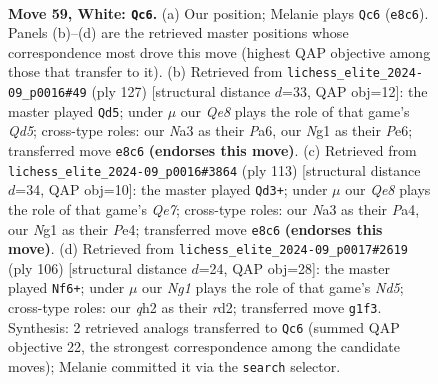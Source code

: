 \documentclass[11pt]{article}
\begin{document}
\clearpage

\begin{figure}[p]\centering
\begin{subfigure}{0.46\textwidth}\centering
\resizebox{\linewidth}{!}{%
\newchessgame
\chessboard[
  setfen={4Q3/7k/p3P3/3P3p/6p1/Nb6/5P1q/5KN1 w - - 1 59},
  showmover=false,
  pgfstyle=straightmove, color=movearrow, markmove={e8-c6}
]}
\caption{}
\end{subfigure}\hfill
\begin{subfigure}{0.46\textwidth}\centering
\resizebox{\linewidth}{!}{%
\newchessgame
\chessboard[
  setfen={6k1/4Q2p/p3p1p1/6P1/P2q3P/6K1/8/8 b - - 9 64},
  showmover=false,
  pgfstyle=straightmove, color=movearrow, markmove={d4-d5}
]}
\caption{}
\end{subfigure}
\\[4pt]
\begin{subfigure}{0.46\textwidth}\centering
\resizebox{\linewidth}{!}{%
\newchessgame
\chessboard[
  setfen={8/6k1/2p5/3p2P1/p3pQ2/2P4K/PP2q3/8 b - - 8 57},
  showmover=false,
  pgfstyle=straightmove, color=movearrow, markmove={e2-d3}
]}
\caption{}
\end{subfigure}\hfill
\begin{subfigure}{0.46\textwidth}\centering
\resizebox{\linewidth}{!}{%
\newchessgame
\chessboard[
  setfen={6k1/1Q6/p2q2p1/3N1pP1/8/1P4PK/3r4/8 w - - 8 54},
  showmover=false,
  pgfstyle=straightmove, color=movearrow, markmove={d5-f6}
]}
\caption{}
\end{subfigure}
\caption{\textbf{Move 59, White: \texttt{Qc6}.} (a) Our position; Melanie plays \texttt{Qc6} (\texttt{e8c6}). Panels (b)--(d) are the retrieved master positions whose correspondence most drove this move (highest QAP objective among those that transfer to it). (b) Retrieved from \texttt{lichess\_elite\_2024-09\_p0016\#49} (ply 127) [structural distance $d$=33, QAP obj=12]: the master played \texttt{Qd5}; under $\mu$ our \emph{Qe8} plays the role of that game's \emph{Qd5}; cross-type roles: our \emph{N}a3 as their \emph{P}a6, our \emph{N}g1 as their \emph{P}e6; transferred move \texttt{e8c6} \textbf{(endorses this move)}. (c) Retrieved from \texttt{lichess\_elite\_2024-09\_p0016\#3864} (ply 113) [structural distance $d$=34, QAP obj=10]: the master played \texttt{Qd3+}; under $\mu$ our \emph{Qe8} plays the role of that game's \emph{Qe7}; cross-type roles: our \emph{N}a3 as their \emph{P}a4, our \emph{N}g1 as their \emph{P}e4; transferred move \texttt{e8c6} \textbf{(endorses this move)}. (d) Retrieved from \texttt{lichess\_elite\_2024-09\_p0017\#2619} (ply 106) [structural distance $d$=24, QAP obj=28]: the master played \texttt{Nf6+}; under $\mu$ our \emph{Ng1} plays the role of that game's \emph{Nd5}; cross-type roles: our \emph{q}h2 as their \emph{r}d2; transferred move \texttt{g1f3}. Synthesis: 2 retrieved analogs transferred to \texttt{Qc6} (summed QAP objective 22, the strongest correspondence among the candidate moves); Melanie committed it via the \texttt{search} selector.}
\label{fig:thought-m116}
\end{figure}
\end{document}

